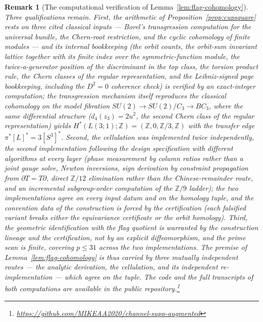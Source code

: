 \documentclass[11pt,a4paper]{article}
\newtheorem{remark}[theorem]{Remark}
\begin{document}
\begin{remark}[The computational verification of Lemma~\ref{lem:flag-cohomology}]
Three qualifications remain. First, the arithmetic of
Proposition~\ref{prop:cupsquare} rests on three cited classical inputs ---
Borel's transgression computation for the universal bundle, the Chern-root
restriction, and the cyclic cohomology of finite modules --- and its
internal bookkeeping (the orbit counts, the orbit-sum invariant lattice
together with its finite index over the symmetric-function module, the
twice-a-generator position of the discriminant in the top class, the torsion
product rule, the Chern classes of the regular representation, and the
Leibniz-signed page bookkeeping, including the $D^2=0$ coherence check) is
verified by an exact-integer computation; the transgression mechanism itself
reproduces the classical cohomology on the model fibration
$SU(2)\to SU(2)/C_3\to BC_3$, where the same differential structure
($d_4(z_3)=2u^2$, the second Chern class of the regular representation)
yields $H^*(L(3;1);\mathbb Z)=
(\mathbb Z,0,\mathbb Z/3,\mathbb Z)$ with the transfer edge
$\pi^*[L]^*=3[S^3]^*$. Second, the cellulation was implemented twice
independently, the second implementation following the design specification
with different algorithms at every layer (phase measurement by column ratios
rather than a joint gauge solve, Newton inversions, sign derivation by
constraint propagation from $\partial T=T\partial$, direct $\mathbb Z/12$
elimination rather than the Chinese-remainder route, and an incremental
subgroup-order computation of the $\mathbb Z/9$ ladder); the two
implementations agree on every input datum and on the homology tuple, and
the convention data of the construction is forced by the certification (each
falsified variant breaks either the equivariance certificate or the orbit
homology). Third, the geometric identification with the flag quotient is
warranted by the construction lineage and the certification, not by an
explicit diffeomorphism, and the prime scan is finite, covering $p\le 31$
across the two implementations. The premise of
Lemma~\ref{lem:flag-cohomology} is thus carried by three mutually
independent routes --- the analytic derivation, the cellulation, and its
independent re-implementation --- which agree on the tuple. The code and
the full transcripts of both computations are available in the public
repository.\footnote{\url{https://github.com/MIKEAA2020/channel-supp-augmented}}
\end{remark}
\end{document}
